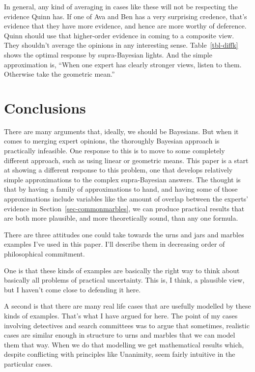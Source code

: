 \documentclass[
  11pt,
  letterpaper,
  DIV=11,
  numbers=noendperiod,
  twoside]{scrartcl}
\begin{document}
In general, any kind of averaging in cases like these will not be
respecting the evidence Quinn has. If one of Ava and Ben has a very
surprising credence, that's evidence that they have more evidence, and
hence are more worthy of deference. Quinn should use that higher-order
evidence in coming to a composite view. They shouldn't average the
opinions in any interesting sense. Table~\ref{tbl-diffk} shows the
optimal response by supra-Bayesian lights. And the simple approximation
is, ``When one expert has clearly stronger views, listen to them.
Otherwise take the geometric mean.''

\section{Conclusions}\label{conclusions}

There are many arguments that, ideally, we should be Bayesians. But when
it comes to merging expert opinions, the thoroughly Bayesian approach is
practically infeasible. One response to this is to move to some
completely different approach, such as using linear or geometric means.
This paper is a start at showing a different response to this problem,
one that develops relatively simple approximations to the complex
supra-Bayesian answers. The thought is that by having a family of
approximations to hand, and having some of those approximations include
variables like the amount of overlap between the experts' evidence in
Section~\ref{sec-commonmarbles}, we can produce practical results that
are both more plausible, and more theoretically sound, than any one
formula.

There are three attitudes one could take towards the urns and jars and
marbles examples I've used in this paper. I'll describe them in
decreasing order of philosophical commitment.

One is that these kinds of examples are basically the right way to think
about basically all problems of practical uncertainty. This is, I think,
a plausible view, but I haven't come close to defending it here.

A second is that there are many real life cases that are usefully
modelled by these kinds of examples. That's what I have argued for here.
The point of my cases involving detectives and search committees was to
argue that sometimes, realistic cases are similar enough in structure to
urns and marbles that we can model them that way. When we do that
modelling we get mathematical results which, despite conflicting with
principles like Unanimity, seem fairly intuitive in the particular
cases.
\end{document}

